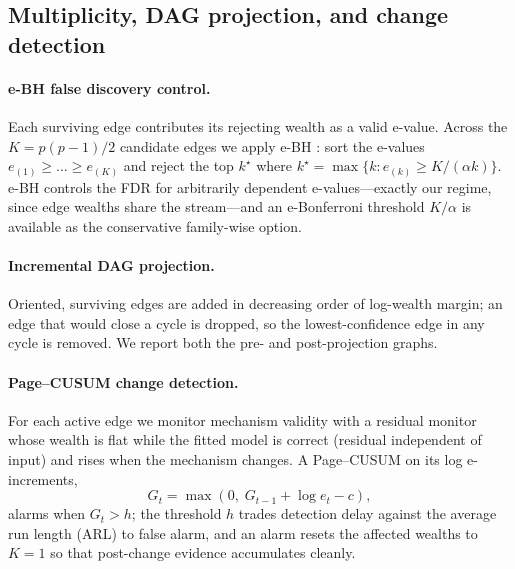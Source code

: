 \documentclass[preprint,12pt,authoryear]{elsarticle}
\begin{document}
\subsection{Multiplicity, DAG projection, and change detection}
\label{sec:multdag}
\paragraph{e-BH false discovery control.}
Each surviving edge contributes its rejecting wealth as a valid e-value. Across
the $K = p(p-1)/2$ candidate edges we apply e-BH \citep{wang2022ebh}: sort the
e-values $e_{(1)} \ge \dots \ge e_{(K)}$ and reject the top $k^\star$ where
$k^\star = \max\{k : e_{(k)} \ge K/(\alpha k)\}$. e-BH controls the FDR for
arbitrarily dependent e-values---exactly our regime, since edge wealths share
the stream---and an e-Bonferroni threshold $K/\alpha$ is available as the
conservative family-wise option.

\paragraph{Incremental DAG projection.}
Oriented, surviving edges are added in decreasing order of log-wealth margin; an
edge that would close a cycle is dropped, so the lowest-confidence edge in any
cycle is removed. We report both the pre- and post-projection graphs.

\paragraph{Page--CUSUM change detection.}
For each active edge we monitor mechanism validity with a residual monitor whose
wealth is flat while the fitted model is correct (residual independent of input)
and rises when the mechanism changes. A Page--CUSUM on its log e-increments,
\begin{equation}
    G_t = \max\!\left(0,\; G_{t-1} + \log e_t - c\right),
    \label{eq:cusum}
\end{equation}
alarms when $G_t > h$; the threshold $h$ trades detection delay against the
average run length (ARL) to false alarm, and an alarm resets the affected
wealths to $K=1$ so that post-change evidence accumulates cleanly.
\end{document}
